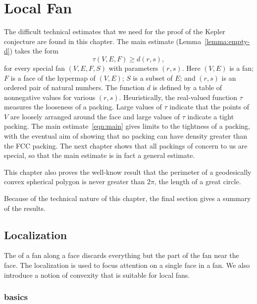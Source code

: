 %

\chapter{Local Fan}\label{sec:local}


\begin{summary}
  The difficult technical estimates that we need for the proof of the
  Kepler conjecture are found in this chapter.  The main estimate
  (Lemma~\ref{lemma:empty-d}) takes the form
\begin{equation}\label{eqn:main}
\tau(V,E,F) \ge d(r,s),
\end{equation}
for every special fan $(V,E,F,S)$ with parameters $(r,s)$.  Here
$(V,E)$ is a fan; $F$ is a face of the hypermap of $(V,E)$; $S$ is a
subset of $E$; and $(r,s)$ is an ordered pair of natural numbers.  The
function $d$ is defined by a table of nonnegative values for various
$(r,s)$.  Heuristically, the real-valued function $\tau$ measures the
looseness of a packing.  Large values of $\tau$ indicate that the
points of $V$ are loosely arranged around the face and large values of
$\tau$ indicate a tight packing.  The main estimate~\ref{eqn:main}
gives limits to the tightness of a packing, with the eventual aim of
showing that no packing can have density greater than the
FCC packing.  The next chapter  shows that all
packings of concern to us are special, so that the main estimate is in
fact a general estimate.

This chapter also proves the well-know result that the perimeter of a
geodesically convex spherical polygon is never greater than $2\pi$,
the length of a great circle.

Because of the technical nature of this chapter, the final section gives a summary
of the results.
\end{summary}


\section{Localization}

The  of a fan along
a face discards everything but the part of the fan near the face.  
The localization is used to focus attention on a single face
in a fan.  
We also introduce a notion of convexity that is suitable for local fans.

\subsection{basics}

